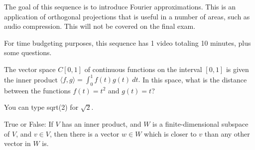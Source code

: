 






The goal of this sequence is to introduce Fourier approximations.  This is an application of orthogonal projections that is useful in a number of areas, such as audio compression.  This will not be covered on the final exam.  


For time budgeting purposes, this sequence has 1 video totaling 10 minutes, 
plus some questions.  




\endedxtext

\endedxvertical





The vector space $C[0,1]$ of continuous functions on the interval $[0,1]$ is given the inner product $\langle f,g\rangle = \int_0^1 f(t)g(t) \ dt.$
In this space, what is the distance between the functions $f(t) = t^2$ and $g(t) = t$?  


You can type sqrt(2) for $\sqrt{2}$.



\endedxproblem



True or False: If $V$ has an inner product, and $W$ is a finite-dimensional subspace of $V$, and $v\in V$, then
there is a vector $w\in W$ which is closer to $v$ than any other vector in $W$ is.  


 
\endedxproblem


\endedxvertical





\endedxvertical

